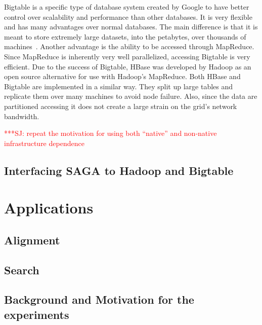 \documentclass{rspublic}
\newcommand{\jhanote}[1]{ {\textcolor{red} { ***SJ: #1 }}}
\newcommand{\jhanote}[1]{}
\begin{document}
Bigtable is a specific type of database system created by Google to
have better control over scalability and performance than other
databases.  It is very flexible and has many advantages over normal
databases.  The main difference is that it is meant to store extremely
large datasets, into the petabytes, over thousands of
machines~\cite{bigtable}.  Another advantage is the ability to be
accessed through MapReduce.  Since MapReduce is inherently very well
parallelized, accessing Bigtable is very efficient.  Due to the
success of Bigtable, HBase was developed by Hadoop as an open source
alternative for use with Hadoop's MapReduce.  Both HBase and Bigtable
are implemented in a similar way.  They split up large tables and
replicate them over many machines to avoid node failure.  Also, since
the data are partitioned accessing it does not create a large strain
on the grid's network bandwidth.


\jhanote{repeat the motivation for using both ``native'' and
  non-native infrastructure dependence}

\subsection*{Interfacing SAGA to Hadoop and Bigtable}


\section{Applications}

\subsection*{Alignment}

\subsection*{Search}



\subsection*{Background and Motivation for the experiments}
\end{document}
